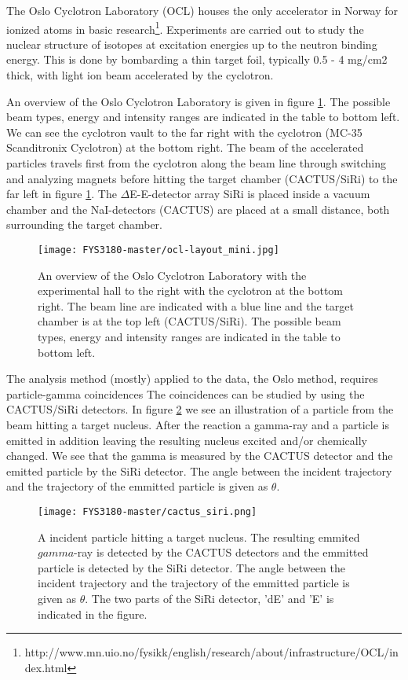 \documentclass[paper=a4, fontsize=11pt]{scrartcl} %
\begin{document}
The Oslo Cyclotron Laboratory (OCL) houses the only accelerator in Norway for ionized atoms in basic research\footnote{http://www.mn.uio.no/fysikk/english/research/about/infrastructure/OCL/index.html}. Experiments are carried out to study the nuclear structure of isotopes at excitation energies up to the neutron binding energy. This is done by bombarding a thin target foil, typically 0.5 - 4 mg/cm2 thick, with light ion beam accelerated by the cyclotron.

An overview of the Oslo Cyclotron Laboratory is given in figure \ref{fig:OLC_exp_hall}. The possible beam types, energy and intensity ranges are indicated in the table to bottom left. We can see the cyclotron vault to the far right with the cyclotron (MC-35 Scanditronix Cyclotron) at the bottom right. The beam of the accelerated particles travels first from the cyclotron along the beam line through switching and analyzing magnets before hitting the target chamber (CACTUS/SiRi) to the far left in figure \ref{fig:OLC_exp_hall}. The $\Delta$E-E-detector array SiRi is placed inside a vacuum chamber and the NaI-detectors (CACTUS) are placed at a small distance, both surrounding the target chamber. 

\begin{figure}[htp]
\centering
\texttt{[image: FYS3180-master/ocl-layout\_mini.jpg]}
\caption{An overview of the Oslo Cyclotron Laboratory with the experimental hall to the right with the cyclotron at the bottom right. The beam line are indicated with a blue line and the target chamber is at the top left (CACTUS/SiRi). The possible beam types, energy and intensity ranges are indicated in the table to bottom left. }
\label{fig:OLC_exp_hall}
\end{figure}

The analysis method (mostly) applied to the data, the Oslo method, requires particle-gamma coincidences The coincidences can be studied by using the CACTUS/SiRi detectors. In figure \ref{fig: cactus_siri} we see an illustration of a particle from the beam hitting a target nucleus. After the reaction a gamma-ray and a particle is emitted in addition leaving the resulting nucleus excited and/or chemically changed. We see that the gamma is measured by the CACTUS detector and the emitted particle by the SiRi detector. The angle between the incident trajectory and the trajectory of the emmitted particle is given as $\theta$.
\begin{figure}[htp]
\centering
\texttt{[image: FYS3180-master/cactus\_siri.png]}
\caption{A incident particle hitting a target nucleus. The resulting emmited $gamma$-ray is detected by the CACTUS detectors and the emmitted particle is detected by the SiRi detector. The angle between the incident trajectory and the trajectory of the emmitted particle is given as $\theta$. The two parts of the SiRi detector, 'dE' and 'E' is indicated in the figure.}
\label{fig: cactus_siri}
\end{figure}
\end{document}
